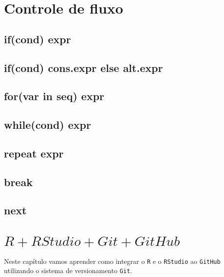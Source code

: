 \documentclass[
  12pt,
  brazilian,
]{book}
\begin{document}
\hypertarget{controle-de-fluxo}{%
\chapter{Controle de fluxo}\label{controle-de-fluxo}}

\hypertarget{ifcond-expr}{%
\section{if(cond) expr}\label{ifcond-expr}}

\hypertarget{ifcond-cons.expr-else-alt.expr}{%
\section{if(cond) cons.expr else alt.expr}\label{ifcond-cons.expr-else-alt.expr}}

\hypertarget{forvar-in-seq-expr}{%
\section{for(var in seq) expr}\label{forvar-in-seq-expr}}

\hypertarget{whilecond-expr}{%
\section{while(cond) expr}\label{whilecond-expr}}

\hypertarget{repeat-expr}{%
\section{repeat expr}\label{repeat-expr}}

\hypertarget{break}{%
\section{break}\label{break}}

\hypertarget{next}{%
\section{next}\label{next}}

\hypertarget{r-rstudio-git-github}{%
\chapter{\texorpdfstring{\(R + RStudio + Git + GitHub\)}{R + RStudio + Git + GitHub}}\label{r-rstudio-git-github}}

Neste capítulo vamos aprender como integrar o \texttt{R} e o \texttt{RStudio} ao \texttt{GitHub} utilizando o sistema de versionamento \texttt{Git}.
\end{document}
